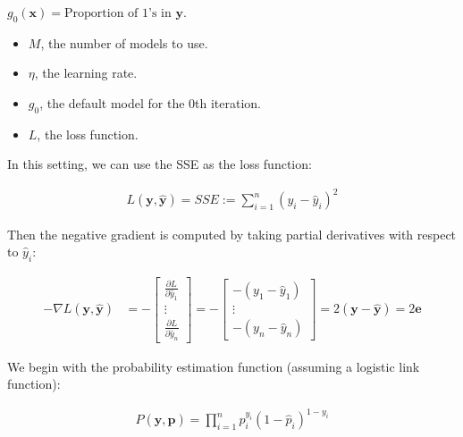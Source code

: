 \documentclass[12pt]{article}
\begin{document}
\begin{enumerate}

$g_0(\bm{x}) = \text{Proportion of $1$'s}$ in $\bm{y}$.


\begin{itemize}
	\item $M$, the number of models to use.
	\item $\eta$, the learning rate.
	\item $g_0$, the default model for the $0$th iteration.
	\item $L$, the loss function.
\end{itemize}


In this setting, we can use the SSE as the loss function:

\begin{align*}
	L(\bm{y}, \hat{\bm{y}}) = SSE := \sum_{i=1}^{n}(y_i - \hat{y}_i)^2
\end{align*}

Then the negative gradient is computed by taking partial derivatives with
respect to $\hat{y}_i$:

\begin{align*}
	-\nabla L(\bm{y}, \hat{\bm{y}})
	&=
	-\begin{bmatrix}
		\frac{\partial L}{\partial \hat{y}_1}\\
		\vdots\\
		\frac{\partial L}{\partial \hat{y}_n}
	\end{bmatrix}
	=-\begin{bmatrix}
		-(y_1 - \hat{y}_1)\\
		\vdots\\
		-(y_n - \hat{y}_n)
	\end{bmatrix}
	=2(\bm{y}-\hat{\bm{y}})
	=2\bm{e}
\end{align*}


We begin with the probability estimation function (assuming a logistic link function):

\begin{align*}
	P(\bm{y}, \hat{\bm{p}}) = \prod_{i=1}^{n}\hat{p}_i^{y_i}(1-\hat{p}_i)^{1-y_i}
\end{align*}


\end{enumerate}
\end{document}
